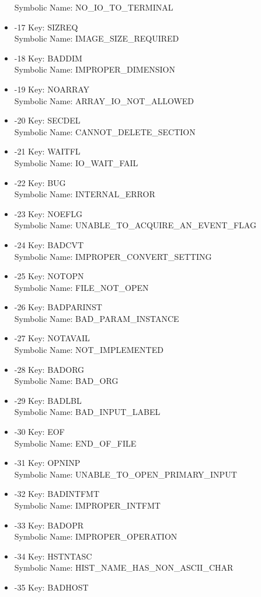 \begin{itemize}
Symbolic Name: NO\_IO\_TO\_TERMINAL
\item -17 Key: SIZREQ \\
Symbolic Name: IMAGE\_SIZE\_REQUIRED
\item -18 Key: BADDIM \\
Symbolic Name: IMPROPER\_DIMENSION
\item -19 Key: NOARRAY \\
Symbolic Name: ARRAY\_IO\_NOT\_ALLOWED
\item -20 Key: SECDEL \\
Symbolic Name: CANNOT\_DELETE\_SECTION
\item -21 Key: WAITFL \\
Symbolic Name: IO\_WAIT\_FAIL
\item -22 Key: BUG \\
Symbolic Name: INTERNAL\_ERROR
\item -23 Key: NOEFLG \\
Symbolic Name: UNABLE\_TO\_ACQUIRE\_AN\_EVENT\_FLAG
\item -24 Key: BADCVT \\
Symbolic Name: IMPROPER\_CONVERT\_SETTING
\item -25 Key: NOTOPN \\
Symbolic Name: FILE\_NOT\_OPEN
\item -26 Key: BADPARINST \\
Symbolic Name: BAD\_PARAM\_INSTANCE
\item -27 Key: NOTAVAIL \\
Symbolic Name: NOT\_IMPLEMENTED
\item -28 Key: BADORG \\
Symbolic Name: BAD\_ORG
\item -29 Key: BADLBL \\
Symbolic Name: BAD\_INPUT\_LABEL
\item -30 Key: EOF \\
Symbolic Name: END\_OF\_FILE
\item -31 Key: OPNINP \\
Symbolic Name: UNABLE\_TO\_OPEN\_PRIMARY\_INPUT
\item -32 Key: BADINTFMT \\
Symbolic Name: IMPROPER\_INTFMT
\item -33 Key: BADOPR \\
Symbolic Name: IMPROPER\_OPERATION
\item -34 Key: HSTNTASC \\
Symbolic Name: HIST\_NAME\_HAS\_NON\_ASCII\_CHAR
\item -35 Key: BADHOST \\

\end{itemize}
